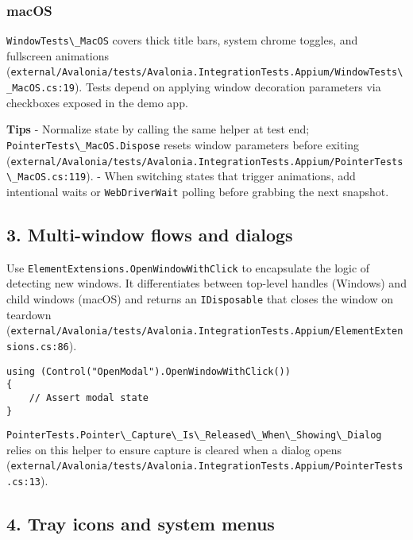 \subsubsection{macOS}\label{macos-5}

\passthrough{\lstinline!WindowTests\_MacOS!} covers thick title bars,
system chrome toggles, and fullscreen animations
(\passthrough{\lstinline!external/Avalonia/tests/Avalonia.IntegrationTests.Appium/WindowTests\_MacOS.cs:19!}).
Tests depend on applying window decoration parameters via checkboxes
exposed in the demo app.

\textbf{Tips} - Normalize state by calling the same helper at test end;
\passthrough{\lstinline!PointerTests\_MacOS.Dispose!} resets window
parameters before exiting
(\passthrough{\lstinline!external/Avalonia/tests/Avalonia.IntegrationTests.Appium/PointerTests\_MacOS.cs:119!}).
- When switching states that trigger animations, add intentional waits
or \passthrough{\lstinline!WebDriverWait!} polling before grabbing the
next snapshot.

\subsection{3. Multi-window flows and
dialogs}\label{multi-window-flows-and-dialogs}

Use \passthrough{\lstinline!ElementExtensions.OpenWindowWithClick!} to
encapsulate the logic of detecting new windows. It differentiates
between top-level handles (Windows) and child windows (macOS) and
returns an \passthrough{\lstinline!IDisposable!} that closes the window
on teardown
(\passthrough{\lstinline!external/Avalonia/tests/Avalonia.IntegrationTests.Appium/ElementExtensions.cs:86!}).

\begin{lstlisting}
using (Control("OpenModal").OpenWindowWithClick())
{
    // Assert modal state
}
\end{lstlisting}

\passthrough{\lstinline!PointerTests.Pointer\_Capture\_Is\_Released\_When\_Showing\_Dialog!}
relies on this helper to ensure capture is cleared when a dialog opens
(\passthrough{\lstinline!external/Avalonia/tests/Avalonia.IntegrationTests.Appium/PointerTests.cs:13!}).

\subsection{4. Tray icons and system
menus}\label{tray-icons-and-system-menus}

